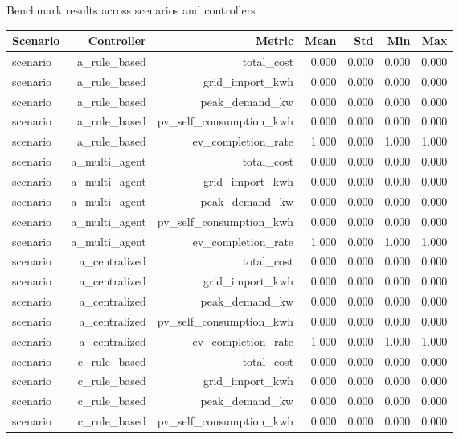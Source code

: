 \centering
\caption{Benchmark results across scenarios and controllers}\n\label{tab:benchmark-results}
\begin{tabular}{lrrrrrr}
\hline
Scenario & Controller & Metric & Mean & Std & Min & Max \\
\hline
scenario & a_rule_based & total_cost & 0.000 & 0.000 & 0.000 & 0.000 \\
scenario & a_rule_based & grid_import_kwh & 0.000 & 0.000 & 0.000 & 0.000 \\
scenario & a_rule_based & peak_demand_kw & 0.000 & 0.000 & 0.000 & 0.000 \\
scenario & a_rule_based & pv_self_consumption_kwh & 0.000 & 0.000 & 0.000 & 0.000 \\
scenario & a_rule_based & ev_completion_rate & 1.000 & 0.000 & 1.000 & 1.000 \\
scenario & a_multi_agent & total_cost & 0.000 & 0.000 & 0.000 & 0.000 \\
scenario & a_multi_agent & grid_import_kwh & 0.000 & 0.000 & 0.000 & 0.000 \\
scenario & a_multi_agent & peak_demand_kw & 0.000 & 0.000 & 0.000 & 0.000 \\
scenario & a_multi_agent & pv_self_consumption_kwh & 0.000 & 0.000 & 0.000 & 0.000 \\
scenario & a_multi_agent & ev_completion_rate & 1.000 & 0.000 & 1.000 & 1.000 \\
scenario & a_centralized & total_cost & 0.000 & 0.000 & 0.000 & 0.000 \\
scenario & a_centralized & grid_import_kwh & 0.000 & 0.000 & 0.000 & 0.000 \\
scenario & a_centralized & peak_demand_kw & 0.000 & 0.000 & 0.000 & 0.000 \\
scenario & a_centralized & pv_self_consumption_kwh & 0.000 & 0.000 & 0.000 & 0.000 \\
scenario & a_centralized & ev_completion_rate & 1.000 & 0.000 & 1.000 & 1.000 \\
scenario & c_rule_based & total_cost & 0.000 & 0.000 & 0.000 & 0.000 \\
scenario & c_rule_based & grid_import_kwh & 0.000 & 0.000 & 0.000 & 0.000 \\
scenario & c_rule_based & peak_demand_kw & 0.000 & 0.000 & 0.000 & 0.000 \\
scenario & c_rule_based & pv_self_consumption_kwh & 0.000 & 0.000 & 0.000 & 0.000 \\

\end{tabular}
